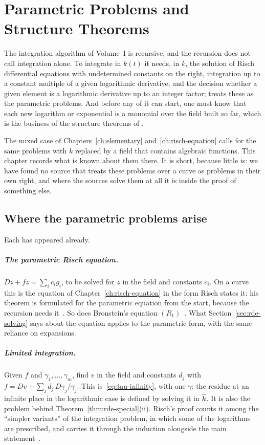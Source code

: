 \chapter[Parametric Problems]{Parametric Problems and Structure Theorems}\label{ch:parametric}

The integration algorithm of Volume~I is recursive, and the recursion does
not call integration alone. To integrate in $k(t)$ it needs, in $k$, the
solution of Risch differential equations with undetermined constants on the
right, integration up to a constant multiple of a given logarithmic
derivative, and the decision whether a given element is a logarithmic
derivative up to an integer factor;  treats these as the
parametric problems. And before any of it can start, one must know that each
new logarithm or exponential is a monomial over the field built so far,
which is the business of the structure theorems of .

The mixed case of Chapters~\ref{ch:elementary} and~\ref{ch:risch-equation}
calls for the same problems with $k$ replaced by a field that contains
algebraic functions. This chapter records what is known about them there.
It is short, because little is: we have found no source that treats these
problems over a curve as problems in their own right, and where the sources
solve them at all it is inside the proof of something else.

\section{Where the parametric problems arise}\label{sec:param-arise}

Each has appeared already.

\paragraph{The parametric Risch equation.} $Dz + f z = \sum_i c_i g_i$, to be
solved for $z$ in the field and constants $c_i$. On a curve this is the
equation of Chapter~\ref{ch:risch-equation} in the form Risch states it: his
theorem is formulated for the parametric equation from the start, because
the recursion needs it~\cite[p.~206, Theorem~1(b)]{raab2022}. So does Bronstein's
equation $(R_1)$~\cite[Part~3]{bronstein1990}. What
Section~\ref{sec:rde-solving} says about the equation applies to the
parametric form, with the same reliance on expansions.

\paragraph{Limited integration.} Given $f$ and $\gamma_1, \dots, \gamma_m$,
find $v$ in the field and constants $d_j$ with $f = Dv + \sum_j d_j\,
D\gamma_j/\gamma_j$. This is~\eqref{eq:tau-infinity}, with one $\gamma$: the
residue at an infinite place in the logarithmic case is defined by solving
it in $\overline{k}$. It is also the problem behind
Theorem~\ref{thm:rde-special}(ii). Risch's proof counts it among the ``simpler
variants'' of the integration problem, in which some of the logarithms are
prescribed, and carries it through the induction alongside the main
statement~\cite[p.~209 and p.~211]{raab2022}.

